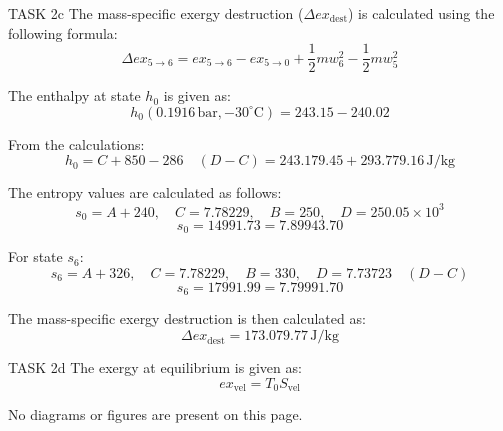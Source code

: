 TASK 2c  
The mass-specific exergy destruction (\( \Delta ex_{\text{dest}} \)) is calculated using the following formula:  
\[
\Delta ex_{5 \to 6} = ex_{5 \to 6} - ex_{5 \to 0} + \frac{1}{2} m w_6^2 - \frac{1}{2} m w_5^2
\]  

The enthalpy at state \( h_0 \) is given as:  
\[
h_0 (0.1916 \, \text{bar}, -30^\circ\text{C}) = 243.15 - 240.02
\]  

From the calculations:  
\[
h_0 = C + 850 - 286 \quad (D - C) = 243.179.45 + 293.779.16 \, \text{J/kg}
\]  

The entropy values are calculated as follows:  
\[
s_0 = A + 240, \quad C = 7.78229, \quad B = 250, \quad D = 250.05 \times 10^3
\]  
\[
s_0 = 14991.73 = 7.89943.70
\]  

For state \( s_6 \):  
\[
s_6 = A + 326, \quad C = 7.78229, \quad B = 330, \quad D = 7.73723 \quad (D - C)
\]  
\[
s_6 = 17991.99 = 7.79991.70
\]  

The mass-specific exergy destruction is then calculated as:  
\[
\Delta ex_{\text{dest}} = 173.079.77 \, \text{J/kg}
\]  

TASK 2d  
The exergy at equilibrium is given as:  
\[
ex_{\text{vel}} = T_0 S_{\text{vel}}
\]  

No diagrams or figures are present on this page.